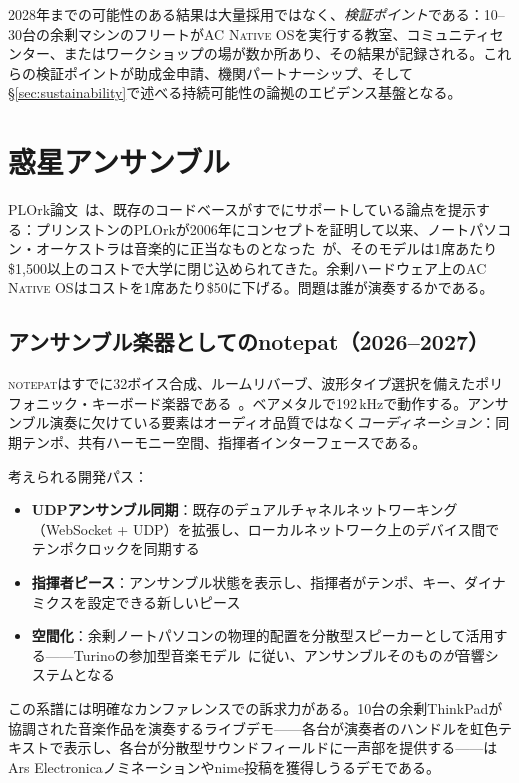 \documentclass[10pt,letterpaper,twocolumn]{article}
\newcommand{\acos}{\textsc{AC Native OS}}
\newcommand{\np}{\textsc{notepat}}
\begin{document}
2028年までの可能性のある結果は大量採用ではなく、\emph{検証ポイント}である：10--30台の余剰マシンのフリートが\acos{}を実行する教室、コミュニティセンター、またはワークショップの場が数か所あり、その結果が記録される。これらの検証ポイントが助成金申請、機関パートナーシップ、そして\S\ref{sec:sustainability}で述べる持続可能性の論拠のエビデンス基盤となる。


\section{惑星アンサンブル}
\label{sec:ensembles}

PLOrk論文~\citep{scudder2026plork}は、既存のコードベースがすでにサポートしている論点を提示する：プリンストンのPLOrkが2006年にコンセプトを証明して以来、ノートパソコン・オーケストラは音楽的に正当なものとなった~\citep{trueman2006plork}が、そのモデルは1席あたり\$1,500以上のコストで大学に閉じ込められてきた。余剰ハードウェア上の\acos{}はコストを1席あたり\$50に下げる。問題は誰が演奏するかである。

\subsection{アンサンブル楽器としてのnotepat（2026--2027）}

\np{}はすでに32ボイス合成、ルームリバーブ、波形タイプ選択を備えたポリフォニック・キーボード楽器である~\citep{scudder2026notepat}。ベアメタルで192\,kHzで動作する。アンサンブル演奏に欠けている要素はオーディオ品質ではなく\emph{コーディネーション}：同期テンポ、共有ハーモニー空間、指揮者インターフェースである。

考えられる開発パス：

\begin{itemize}
  \item \textbf{UDPアンサンブル同期}：既存のデュアルチャネルネットワーキング（WebSocket + UDP）を拡張し、ローカルネットワーク上のデバイス間でテンポクロックを同期する
  \item \textbf{指揮者ピース}：アンサンブル状態を表示し、指揮者がテンポ、キー、ダイナミクスを設定できる新しいピース
  \item \textbf{空間化}：余剰ノートパソコンの物理的配置を分散型スピーカーとして活用する——Turinoの参加型音楽モデル~\citep{turino2008music}に従い、アンサンブルそのもの\emph{が}音響システムとなる
\end{itemize}

この系譜には明確なカンファレンスでの訴求力がある。10台の余剰ThinkPadが協調された音楽作品を演奏するライブデモ——各台が演奏者のハンドルを虹色テキストで表示し、各台が分散型サウンドフィールドに一声部を提供する——はArs Electronicaノミネーションやnime投稿を獲得しうるデモである。
\end{document}
